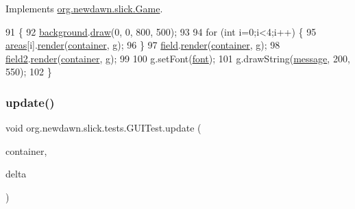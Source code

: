 Implements \mbox{\hyperlink{interfaceorg_1_1newdawn_1_1slick_1_1_game_af1a4670d43eb3ba04dfcf55ab1975b64}{org.\+newdawn.\+slick.\+Game}}.


\begin{DoxyCode}
91                                                             \{
92         \mbox{\hyperlink{classorg_1_1newdawn_1_1slick_1_1tests_1_1_g_u_i_test_aa63cadd39b15e1dd6eef04bba3ceedcb}{background}}.\mbox{\hyperlink{classorg_1_1newdawn_1_1slick_1_1_image_a9bddcca05c7140ab45df8ac5b250b6cd}{draw}}(0, 0, 800, 500);
93         
94         \textcolor{keywordflow}{for} (\textcolor{keywordtype}{int} i=0;i<4;i++) \{
95             \mbox{\hyperlink{classorg_1_1newdawn_1_1slick_1_1tests_1_1_g_u_i_test_a45e7638907d2d4662aca08ffa006a326}{areas}}[i].\mbox{\hyperlink{classorg_1_1newdawn_1_1slick_1_1gui_1_1_mouse_over_area_a37b442cacc81eec200efb0fa76d86fe0}{render}}(\mbox{\hyperlink{classorg_1_1newdawn_1_1slick_1_1tests_1_1_g_u_i_test_a71a14c16d92d7fbb77511e4fc241e8b9}{container}}, g);
96         \}
97         \mbox{\hyperlink{classorg_1_1newdawn_1_1slick_1_1tests_1_1_g_u_i_test_ac005591c69d926ba54c72956127cc998}{field}}.\mbox{\hyperlink{classorg_1_1newdawn_1_1slick_1_1gui_1_1_text_field_ab0ccda30370e0b9b27cf398c38fc5b83}{render}}(\mbox{\hyperlink{classorg_1_1newdawn_1_1slick_1_1tests_1_1_g_u_i_test_a71a14c16d92d7fbb77511e4fc241e8b9}{container}}, g);
98         \mbox{\hyperlink{classorg_1_1newdawn_1_1slick_1_1tests_1_1_g_u_i_test_a1365fed5962b416d829b81fc02d7d60e}{field2}}.\mbox{\hyperlink{classorg_1_1newdawn_1_1slick_1_1gui_1_1_text_field_ab0ccda30370e0b9b27cf398c38fc5b83}{render}}(\mbox{\hyperlink{classorg_1_1newdawn_1_1slick_1_1tests_1_1_g_u_i_test_a71a14c16d92d7fbb77511e4fc241e8b9}{container}}, g);
99         
100         g.setFont(\mbox{\hyperlink{classorg_1_1newdawn_1_1slick_1_1tests_1_1_g_u_i_test_ae827e316c6fbf350d3221fa2e824265d}{font}});
101         g.drawString(\mbox{\hyperlink{classorg_1_1newdawn_1_1slick_1_1tests_1_1_g_u_i_test_abd20571a152e1beddc3e70a5c3e348a6}{message}}, 200, 550);
102     \}
\end{DoxyCode}
\mbox{\label{classorg_1_1newdawn_1_1slick_1_1tests_1_1_g_u_i_test_aad468403d8af3ad670c5a85b0e876dd5}} 
\subsubsection{\texorpdfstring{update()}{update()}}
{\footnotesize\ttfamily void org.\+newdawn.\+slick.\+tests.\+G\+U\+I\+Test.\+update (\begin{DoxyParamCaption}\item[{\mbox{\hyperlink{classorg_1_1newdawn_1_1slick_1_1_game_container}{Game\+Container}}}]{container,  }\item[{int}]{delta }\end{DoxyParamCaption})\hspace{0.3cm}{\ttfamily [inline]}}

